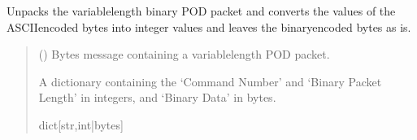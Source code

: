 \documentclass[letterpaper,10pt,english]{sphinxmanual}
\begin{document}
\begin{fulllineitems}
\begin{fulllineitems}
\end{fulllineitems}


\begin{fulllineitems}
\label{\detokenize{PodDevice_8401HR:PodDevice_8401HR.POD_8401HR.TranslatePODpacket_Binary}}
\pysigstartsignatures
{}
\pysigstopsignatures
\sphinxAtStartPar
Unpacks the variable\sphinxhyphen{}length binary POD packet and converts the values of the ASCII\sphinxhyphen{}encoded
bytes into integer values and leaves the binary\sphinxhyphen{}encoded bytes as is.
\begin{quote}\begin{description}
\sphinxAtStartPar
{} () \textendash{} Bytes message containing a variable\sphinxhyphen{}length POD packet.

\sphinxAtStartPar
A dictionary containing the ‘Command Number’ and ‘Binary Packet Length’                 in integers, and ‘Binary Data’ in bytes.

\sphinxAtStartPar
dict{[}str,int|bytes{]}

\end{description}\end{quote}

\end{fulllineitems}



\end{fulllineitems}
\end{document}
